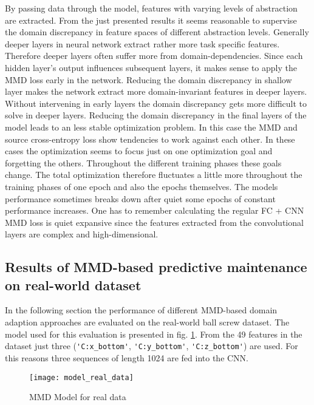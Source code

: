By passing data through the model, features with varying levels of abstraction are extracted. From the just presented results it seems reasonable to supervise the domain discrepancy in feature spaces of different abstraction levels. Generally deeper layers in neural network extract rather more task specific features. Therefore deeper layers often suffer more from domain-dependencies. Since each hidden layer's output influences subsequent layers, it makes sense to apply the MMD loss early in the network. Reducing the domain discrepancy in shallow layer makes the network extract more domain-invariant features in deeper layers. Without intervening in early layers the domain discrepancy gets more difficult to solve in deeper layers. Reducing the domain discrepancy in the final layers of the model leads to an less stable optimization problem. In this case the MMD and source cross-entropy loss show tendencies to work against each other. In these cases the optimization seems to focus just on one optimization goal and forgetting the others. Throughout the different training phases these goals change. The total optimization therefore fluctuates a little more throughout the training phases of one epoch and also the epochs themselves. The models performance sometimes breaks down after quiet some epochs of constant performance increases. One has to remember calculating the regular FC + CNN MMD loss is quiet expansive since the features extracted from the convolutional layers are complex and high-dimensional.



\subsection{Results of MMD-based predictive maintenance on real-world dataset}
In the following section the performance of different MMD-based domain adaption approaches are evaluated on the real-world ball screw dataset. The model used for this evaluation is presented in fig. \ref{fig:model_real_data}. From the 49 features in the dataset just three (\verb|'C:x_bottom'|, \verb|'C:y_bottom'|, \verb|'C:z_bottom'|) are used. For this reasons three sequences of length 1024 are fed into the CNN.

\begin{figure}[htpb]
  \centering
  \texttt{[image: model\_real\_data]}
  \caption {MMD Model for real data} \label{fig:model_real_data}
\end{figure}
\FloatBarrier 

